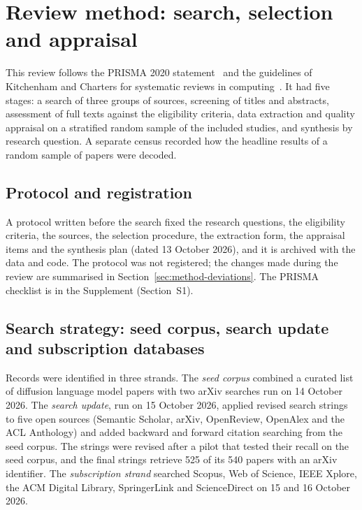 \section{Review method: search, selection and appraisal}
\label{sec:method}

This review follows the PRISMA 2020 statement~\cite{page2021prisma} and the guidelines of Kitchenham and Charters for systematic reviews in computing~\cite{kitchenham2007guidelines}. It had five stages: a search of three groups of sources, screening of titles and abstracts, assessment of full texts against the eligibility criteria, data extraction and quality appraisal on a stratified random sample of the included studies, and synthesis by research question. A separate census recorded how the headline results of a random sample of papers were decoded.

\subsection{Protocol and registration}
\label{sec:method-design}
A protocol written before the search fixed the research questions, the eligibility criteria, the sources, the selection procedure, the extraction form, the appraisal items and the synthesis plan (dated 13 October 2026), and it is archived with the data and code. The protocol was not registered; the changes made during the review are summarised in Section~\ref{sec:method-deviations}. The PRISMA checklist is in the Supplement (Section~S1).

\subsection{Search strategy: seed corpus, search update and subscription databases}
\label{sec:method-sources}
Records were identified in three strands. The \emph{seed corpus} combined a curated list of diffusion language model papers with two arXiv searches run on 14 October 2026. The \emph{search update}, run on 15 October 2026, applied revised search strings to five open sources (Semantic Scholar, arXiv, OpenReview, OpenAlex and the ACL Anthology) and added backward and forward citation searching from the seed corpus. The strings were revised after a pilot that tested their recall on the seed corpus, and the final strings retrieve 525 of its 540 papers with an arXiv identifier. The \emph{subscription strand} searched Scopus, Web of Science, IEEE Xplore, the ACM Digital Library, SpringerLink and ScienceDirect on 15 and 16 October 2026.

